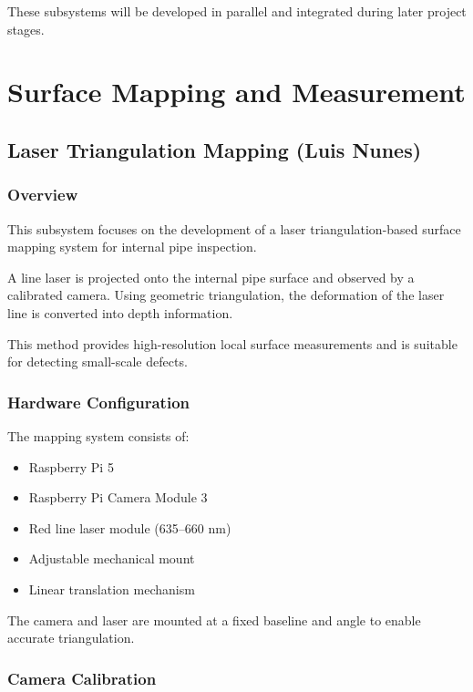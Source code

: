 \documentclass[11pt,a4paper]{article}
\begin{document}
These subsystems will be developed in parallel and integrated during later project stages.

\section{Surface Mapping and Measurement}

\subsection{Laser Triangulation Mapping (Luis Nunes)}

\subsubsection{Overview}

This subsystem focuses on the development of a laser triangulation-based surface mapping system for internal pipe inspection.

A line laser is projected onto the internal pipe surface and observed by a calibrated camera. Using geometric triangulation, the deformation of the laser line is converted into depth information.

This method provides high-resolution local surface measurements and is suitable for detecting small-scale defects.

\subsubsection{Hardware Configuration}

The mapping system consists of:

\begin{itemize}
  \item Raspberry Pi 5
  \item Raspberry Pi Camera Module 3
  \item Red line laser module (635--660 nm)
  \item Adjustable mechanical mount
  \item Linear translation mechanism
\end{itemize}

The camera and laser are mounted at a fixed baseline and angle to enable accurate triangulation.

\subsubsection{Camera Calibration}
\end{document}
